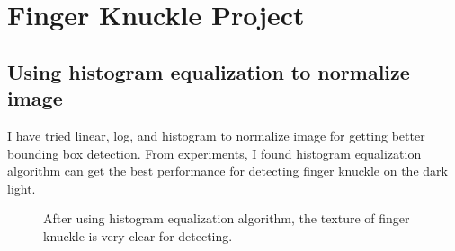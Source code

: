 \section{Finger Knuckle Project}
\subsection{Using histogram equalization to normalize image}
I have tried linear, log, and histogram to normalize image for getting better bounding box detection. From experiments, I found histogram equalization algorithm can get the best performance for detecting finger knuckle on the dark light.


\begin{figure}[ht!]
    \centering


    \caption{After using histogram equalization algorithm, the texture of finger knuckle is very clear for detecting.}
    \label{histogram}
\end{figure}

